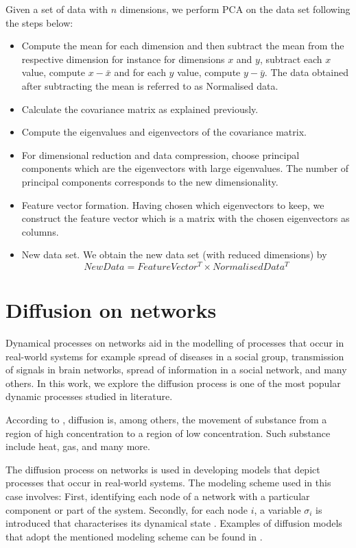 \documentclass[10pt,a4paper]{article}
\begin{document}
       Given a set of data with $n$ dimensions, we perform PCA on the data set following the steps below:
       \begin{itemize}
       	\item Compute the mean for each dimension and then subtract the mean from the respective dimension for instance for dimensions $x$ and $y$, subtract each $x$ value, compute $x-\bar{x}$ and for each $y$ value, compute $y-\bar{y}$. The data obtained after subtracting the mean is referred to as Normalised data.
       	\item Calculate the covariance matrix as explained previously.
       	\item Compute the eigenvalues and eigenvectors of the covariance matrix.
       	\item For dimensional reduction and data compression, choose principal components which are the eigenvectors with large eigenvalues. The number of principal components corresponds to the new dimensionality.
       	\item Feature vector formation. Having chosen which eigenvectors to keep, we construct the feature vector which is a matrix with the chosen eigenvectors as columns.
       	\item New data set. We obtain the new data set (with reduced dimensions) by 
       	 \begin{equation}
       	 NewData = FeatureVector^T \times NormalisedData^T
       	 \end{equation}
       	
       \end{itemize}
    
    \newpage
    \section{Diffusion on networks}
    Dynamical processes on networks aid in the modelling of processes that occur in real-world systems for example spread of diseases in a social group, transmission of signals in brain networks, spread of information in a social network, and many others. In this work, we explore the diffusion process is one of the most popular dynamic processes studied in literature.
    
    According to \citep{newman2010networks}, diffusion is, among others, the movement of substance from a region of high concentration to a region of low concentration. Such substance include heat, gas, and many more. 
    
    The diffusion process on networks is used in developing models that depict processes that occur in real-world systems. The modeling scheme used in this case involves: First, identifying each node of a network with a particular component or part of the system. Secondly, for each node $i$, a variable $\sigma_i$ is introduced that characterises its dynamical state \citep{barrat2008dynamical}. Examples of diffusion models that adopt the mentioned modeling scheme can be found in \citep{estrada2011epidemic,kasprzak2012diffusion,lopez2008diffusion}. 
    
\end{document}

